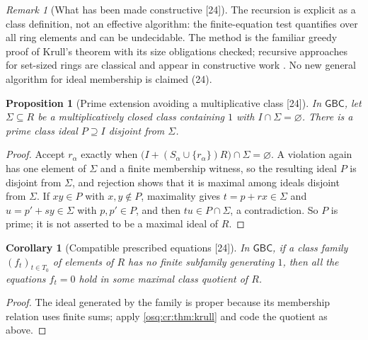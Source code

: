 \documentclass[11pt,letterpaper]{article}
\numberwithin{equation}{section}
\newtheorem{proposition}[proposition]{Proposition}
\newtheorem{corollary}[corollary]{Corollary}
\theoremstyle{definition}
\theoremstyle{remark}
\newtheorem{remark}[remark]{Remark}
\theoremstyle{plain}
\newcommand{\src}[1]{\textup{\textsf{[#1]}}}
\begin{document}
\begin{remark}[What has been made constructive \src{24}]\label{osq:cr:rem:constructive}
The recursion is explicit as a class definition, not an effective algorithm: the finite-equation test quantifies over all ring elements and can be
undecidable. The method is the familiar greedy proof of Krull's theorem with its size obligations checked; recursive approaches for set-sized rings are
classical and appear in constructive work \cite{BlechschmidtSchuster}. No new general algorithm for ideal membership is claimed (24).
\end{remark}

\begin{proposition}[Prime extension avoiding a multiplicative class \src{24}]\label{osq:cr:prop:avoid}
In $\mathsf{GBC}$, let $\Sigma\subseteq R$ be a multiplicatively closed class containing $1$ with $I\cap\Sigma=\varnothing$. There is a prime class
ideal $P\supseteq I$ disjoint from $\Sigma$.
\end{proposition}
\begin{proof}
Accept $r_\alpha$ exactly when $\bigl(I+(S_\alpha\cup\{r_\alpha\})R\bigr)\cap\Sigma=\varnothing$. A violation again has one element of $\Sigma$ and a
finite membership witness, so the resulting ideal $P$ is disjoint from $\Sigma$, and rejection shows that it is maximal among ideals disjoint from
$\Sigma$. If $xy\in P$ with $x,y\notin P$, maximality gives $t=p+rx\in\Sigma$ and $u=p'+sy\in\Sigma$ with $p,p'\in P$, and then $tu\in P\cap\Sigma$, a
contradiction. So $P$ is prime; it is not asserted to be a maximal ideal of $R$.
\end{proof}

\begin{corollary}[Compatible prescribed equations \src{24}]\label{osq:cr:cor:prescribe}
In $\mathsf{GBC}$, if a class family $(f_t)_{t\in T_0}$ of elements of $R$ has no finite subfamily generating $1$, then all the equations $f_t=0$
hold in some maximal class quotient of $R$.
\end{corollary}
\begin{proof}
The ideal generated by the family is proper because its membership relation uses finite sums; apply \cref{osq:cr:thm:krull} and code the quotient
as above.
\end{proof}
\end{document}
